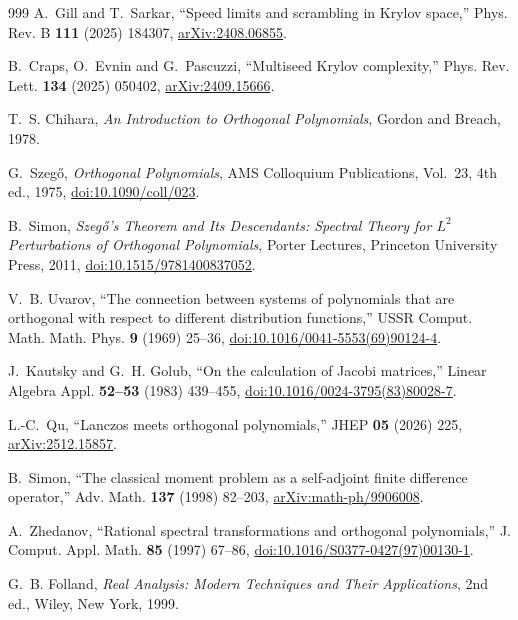 \documentclass[a4paper,11pt]{article}
\theoremstyle{definition}
\theoremstyle{remark}
\begin{document}
\begin{thebibliography}{999}
A.~Gill and T.~Sarkar, ``Speed limits and scrambling in Krylov space,''
Phys. Rev. B \textbf{111} (2025) 184307,
\href{https://arxiv.org/abs/2408.06855}{arXiv:2408.06855}.

B.~Craps, O.~Evnin and G.~Pascuzzi, ``Multiseed Krylov complexity,'' Phys. Rev. Lett. \textbf{134} (2025) 050402, \href{https://arxiv.org/abs/2409.15666}{arXiv:2409.15666}.

T.~S. Chihara, \emph{An Introduction to Orthogonal Polynomials}, Gordon and Breach, 1978.

G.~Szeg\H{o}, \emph{Orthogonal Polynomials}, AMS Colloquium Publications, Vol.~23, 4th ed., 1975,
\href{https://doi.org/10.1090/coll/023}{doi:10.1090/coll/023}.

B.~Simon, \emph{Szeg\H{o}'s Theorem and Its Descendants: Spectral Theory for $L^2$ Perturbations of Orthogonal Polynomials}, Porter Lectures, Princeton University Press, 2011,
\href{https://doi.org/10.1515/9781400837052}{doi:10.1515/9781400837052}.

V.~B. Uvarov,
``The connection between systems of polynomials that are orthogonal with respect to different distribution functions,''
USSR Comput. Math. Math. Phys. \textbf{9} (1969) 25--36,
\href{https://doi.org/10.1016/0041-5553(69)90124-4}{doi:10.1016/0041-5553(69)90124-4}.

J.~Kautsky and G.~H. Golub,
``On the calculation of Jacobi matrices,''
Linear Algebra Appl. \textbf{52--53} (1983) 439--455,
\href{https://doi.org/10.1016/0024-3795(83)80028-7}{doi:10.1016/0024-3795(83)80028-7}.

L.-C.~Qu, ``Lanczos meets orthogonal polynomials,''
 JHEP \textbf{05} (2026) 225,
\href{https://arxiv.org/abs/2512.15857}{arXiv:2512.15857}.

B.~Simon,
``The classical moment problem as a self-adjoint finite difference operator,''
Adv. Math. \textbf{137} (1998) 82--203,
\href{https://arxiv.org/abs/math-ph/9906008}{arXiv:math-ph/9906008}.

A.~Zhedanov, ``Rational spectral transformations and orthogonal polynomials,'' J. Comput. Appl. Math. \textbf{85} (1997) 67--86,
\href{https://doi.org/10.1016/S0377-0427(97)00130-1}{doi:10.1016/S0377-0427(97)00130-1}.

G.~B. Folland,
\emph{Real Analysis: Modern Techniques and Their Applications},
2nd ed.,
Wiley, New York, 1999.


\end{thebibliography}
\end{document}
